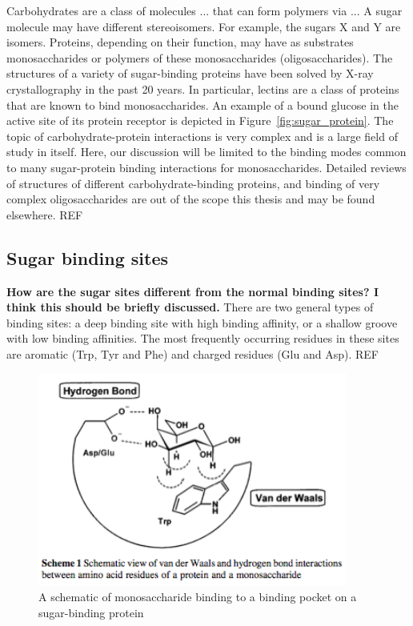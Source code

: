 Carbohydrates are a class of molecules ... that can form polymers via ... A sugar molecule may have different stereoisomers. For example, the sugars X and Y are isomers. Proteins, depending on their function, may have as substrates monosaccharides or polymers of these monosaccharides (oligosaccharides). The structures of a variety of sugar-binding proteins have been solved by X-ray crystallography in the past 20 years. In particular, lectins are a class of proteins that are known to bind monosaccharides.\cite{Rini:1995p2497} An example of a bound glucose in the active site of its protein receptor is depicted in Figure~\ref{fig:sugar_protein}.  The topic of carbohydrate-protein interactions is very complex and is a large field of study in itself.  Here, our discussion will be limited to the binding modes common to many sugar-protein binding interactions for monosaccharides. Detailed reviews of structures of different carbohydrate-binding proteins, and binding of very complex oligosaccharides are out of the scope this thesis and may be found elsewhere. REF

\subsection{Sugar binding sites}
\textbf{How are the sugar sites different from the normal binding sites? I think this should be briefly discussed.}
There are two general types of binding sites: a deep binding site with high binding affinity, or a shallow groove with low binding affinities. The most frequently occurring residues in these sites are aromatic (Trp, Tyr and Phe) and charged residues (Glu and Asp). REF

\begin{figure}
 \centering
 \includegraphics[width=4in]{figures/introduction/sugar_protein_schematic.png}
 \caption[A schematic of monosaccharide-protein binding mode]{A schematic of monosaccharide binding to a binding pocket on a sugar-binding protein}
 \label{fig:sugar_protein_schematic}
\end{figure}

